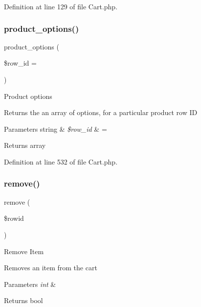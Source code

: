 Definition at line 129 of file Cart.\+php.

\mbox{\label{class_c_i___cart_a461e270ceff8b04d40e14e00b9c74447}} 
\subsubsection{\texorpdfstring{product\_options()}{product\_options()}}
{\footnotesize\ttfamily product\+\_\+options (\begin{DoxyParamCaption}\item[{}]{\$row\+\_\+id = {\ttfamily \textquotesingle{}\textquotesingle{}} }\end{DoxyParamCaption})}

Product options

Returns the an array of options, for a particular product row ID


\begin{DoxyParams}[1]{Parameters}
string & {\em \$row\+\_\+id} & = \textquotesingle{}\textquotesingle{} \\
\hline
\end{DoxyParams}
\begin{DoxyReturn}{Returns}
array 
\end{DoxyReturn}


Definition at line 532 of file Cart.\+php.

\mbox{\label{class_c_i___cart_acb40031fae650e22e4a32878c02dfbf7}} 
\subsubsection{\texorpdfstring{remove()}{remove()}}
{\footnotesize\ttfamily remove (\begin{DoxyParamCaption}\item[{}]{\$rowid }\end{DoxyParamCaption})}

Remove Item

Removes an item from the cart


\begin{DoxyParams}{Parameters}
{\em int} & \\
\hline
\end{DoxyParams}
\begin{DoxyReturn}{Returns}
bool 
\end{DoxyReturn}


